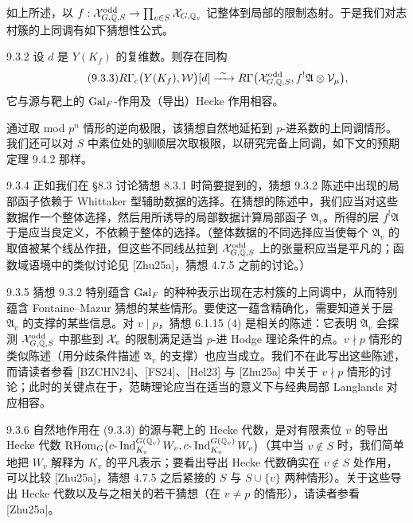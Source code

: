 如上所述，以 $f:\mathcal{X}^{\mathrm{odd}}_{G,\mathbb{Q},S}\to\prod_{v\in S}\mathcal{X}_{G,\mathbb{Q}_v}$ 记整体到局部的限制态射。于是我们对志村簇的上同调有如下猜想性公式。

\begin{conj}{9.3.2}\label{conj:a4-9-3-2}
设 $d$ 是 $Y(K_f)$ 的复维数。则存在同构
\begin{equation}\tag{9.3.3}\label{eq:a4-9-3-3}
R\Gamma_c\bigl(Y(K_f),\mathcal W\bigr)[d]\xrightarrow{\ \sim\ } R\Gamma\bigl(\mathcal{X}^{\mathrm{odd}}_{G,\mathbb{Q},S},f^!\mathfrak A\otimes\mathcal V_\mu\bigr),
\end{equation}
它与源与靶上的 $\operatorname{Gal}_F$-作用及（导出）Hecke 作用相容。
\end{conj}

通过取 mod $p^n$ 情形的逆向极限，该猜想自然地延拓到 $p$-进系数的上同调情形。我们还可以对 $S$ 中素位处的驯顺层次取极限，以研究完备上同调，如下文的预期定理 9.4.2 那样。

\begin{rem}{9.3.4}\label{rem:a4-9-3-4}
正如我们在 §8.3 讨论猜想 8.3.1 时简要提到的，猜想 9.3.2 陈述中出现的局部函子依赖于 Whittaker 型辅助数据的选择。在猜想的陈述中，我们应当对这些数据作一个整体选择，然后用所诱导的局部数据计算局部函子 $\mathfrak A_v$。所得的层 $f^!\mathfrak A$ 于是应当良定义，不依赖于整体的选择。（整体数据的不同选择应当使每个 $\mathfrak A_v$ 的取值被某个线丛作扭，但这些不同线丛拉到 $\mathcal{X}^{\mathrm{odd}}_{G,\mathbb{Q},S}$ 上的张量积应当是平凡的；函数域语境中的类似讨论见 [Zhu25a]，猜想 4.7.5 之前的讨论。）
\end{rem}

\begin{rem}{9.3.5}\label{rem:a4-9-3-5}
猜想 9.3.2 特别蕴含 $\operatorname{Gal}_F$ 的种种表示出现在志村簇的上同调中，从而特别蕴含 Fontaine--Mazur 猜想的某些情形。要使这一蕴含精确化，需要知道关于层 $\mathfrak A_v$ 的支撑的某些信息。对 $v\mid p$，猜想 6.1.15 (4) 是相关的陈述：它表明 $\mathfrak A_v$ 会探测 $\mathcal{X}^{\mathrm{odd}}_{G,\mathbb{Q},S}$ 中那些到 $\mathcal{X}_v$ 的限制满足适当 $p$-进 Hodge 理论条件的点。$v\nmid p$ 情形的类似陈述（用分歧条件描述 $\mathfrak A_v$ 的支撑）也应当成立。我们不在此写出这些陈述，而请读者参看 [BZCHN24]、[FS24]、[Hel23] 与 [Zhu25a] 中关于 $v\nmid p$ 情形的讨论；此时的关键点在于，范畴理论应当在适当的意义下与经典局部 Langlands 对应相容。
\end{rem}

\begin{rem}{9.3.6}\label{rem:a4-9-3-6}
自然地作用在 (9.3.3) 的源与靶上的 Hecke 代数，是对有限素位 $v$ 的导出 Hecke 代数 $\mathrm{RHom}_G\bigl(c\text{-}\operatorname{Ind}_{K_v}^{G(\mathbb{Q}_v)}W_v,c\text{-}\operatorname{Ind}_{K_v}^{G(\mathbb{Q}_v)}W_v\bigr)$（其中当 $v\notin S$ 时，我们简单地把 $W_v$ 解释为 $K_v$ 的平凡表示；要看出导出 Hecke 代数确实在 $v\notin S$ 处作用，可以比较 [Zhu25a]，猜想 4.7.5 之后紧接的 $S$ 与 $S\cup\{v\}$ 两种情形）。关于这些导出 Hecke 代数以及与之相关的若干猜想（在 $v\neq p$ 的情形），请读者参看 [Zhu25a]。
\end{rem}

